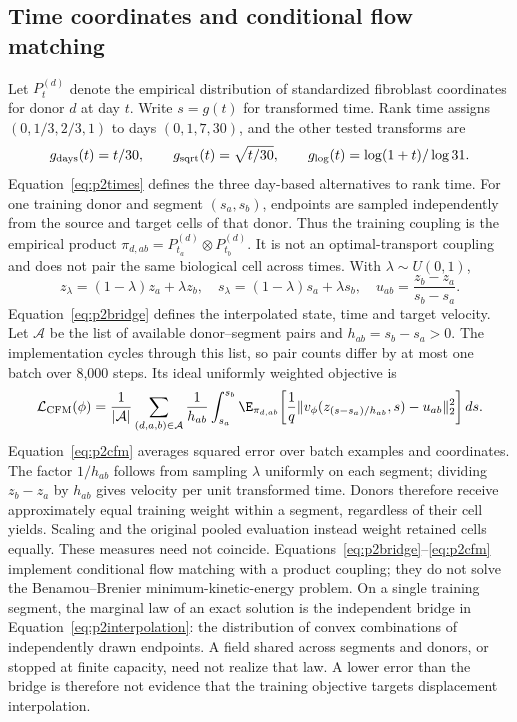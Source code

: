 \documentclass[10pt,a4paper]{article}
\begin{document}
\subsection{Time coordinates and conditional flow matching}
Let $P_t^{(d)}$ denote the empirical distribution of standardized fibroblast coordinates for donor $d$ at day $t$. Write $s=g(t)$ for transformed time. Rank time assigns $(0,1/3,2/3,1)$ to days $(0,1,7,30)$, and the other tested transforms are
\begin{equation}
g_{\rm days}(t)=t/30,\qquad
g_{\rm sqrt}(t)=\sqrt{t/30},\qquad
g_{\rm log}(t)=\log(1+t)/\log31.\label{eq:p2times}
\end{equation}
Equation~\eqref{eq:p2times} defines the three day-based alternatives to rank time. For one training donor and segment $(s_a,s_b)$, endpoints are sampled independently from the source and target cells of that donor. Thus the training coupling is the empirical product $\pi_{d,ab}=P_{t_a}^{(d)}\otimes P_{t_b}^{(d)}$. It is not an optimal-transport coupling and does not pair the same biological cell across times. With $\lambda\sim U(0,1)$,
\begin{equation}
z_\lambda=(1-\lambda)z_a+\lambda z_b,\quad
s_\lambda=(1-\lambda)s_a+\lambda s_b,\quad
u_{ab}=\frac{z_b-z_a}{s_b-s_a}.\label{eq:p2bridge}
\end{equation}
Equation~\eqref{eq:p2bridge} defines the interpolated state, time and target velocity. Let $\mathcal A$ be the list of available donor--segment pairs and $h_{ab}=s_b-s_a>0$. The implementation cycles through this list, so pair counts differ by at most one batch over 8,000 steps. Its ideal uniformly weighted objective is
\begin{equation}
\mathcal L_{\rm CFM}(\phi)=\frac1{|\mathcal A|}\sum_{(d,a,b)\in\mathcal A}\frac1{h_{ab}}
\int_{s_a}^{s_b}\E_{\pi_{d,ab}}\!\left[\frac1q\|v_\phi(z_{(s-s_a)/h_{ab}},s)-u_{ab}\|_2^2\right]ds.\label{eq:p2cfm}
\end{equation}
Equation~\eqref{eq:p2cfm} averages squared error over batch examples and coordinates. The factor $1/h_{ab}$ follows from sampling $\lambda$ uniformly on each segment; dividing $z_b-z_a$ by $h_{ab}$ gives velocity per unit transformed time. Donors therefore receive approximately equal training weight within a segment, regardless of their cell yields. Scaling and the original pooled evaluation instead weight retained cells equally. These measures need not coincide. Equations~\eqref{eq:p2bridge}--\eqref{eq:p2cfm} implement conditional flow matching with a product coupling; they do not solve the Benamou--Brenier minimum-kinetic-energy problem. On a single training segment, the marginal law of an exact solution is the independent bridge in Equation~\eqref{eq:p2interpolation}: the distribution of convex combinations of independently drawn endpoints. A field shared across segments and donors, or stopped at finite capacity, need not realize that law. A lower error than the bridge is therefore not evidence that the training objective targets displacement interpolation.
\end{document}
